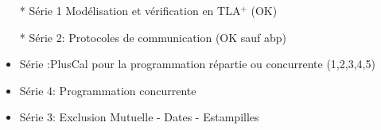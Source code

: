\newcommand{\taille}{\small}
\newcommand{\bc}[1]{#1}
\newcommand{\fois}{*} 
\newcommand{\atree}{{\sf atree}}


\begin{itemize}

\item[*] %
  {S\'erie 1  Mod\'elisation et v\'erification en TLA$^+$}  (OK)
\item[*] %
  {S\'erie 2:    Protocoles de communication}  (OK sauf  abp)
\item%
  {S\'erie :PlusCal pour la programmation r\'epartie
    ou concurrente}  (1,2,3,4,5)
\item %
  {S\'erie 4:   Programmation concurrente}
\item %
  {S\'erie 3:   Exclusion Mutuelle - Dates - Estampilles}
  
\end{itemize}



%










